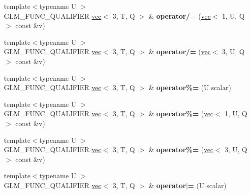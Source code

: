 \begin{DoxyCompactItemize}
{\footnotesize template$<$typename U $>$ }\\G\+L\+M\+\_\+\+F\+U\+N\+C\+\_\+\+Q\+U\+A\+L\+I\+F\+I\+ER \hyperlink{structglm_1_1vec}{vec}$<$ 3, T, Q $>$ \& {\bfseries operator/=} (\hyperlink{structglm_1_1vec}{vec}$<$ 1, U, Q $>$ const \&v)
\item 
\mbox{\label{structglm_1_1vec_3_013_00_01T_00_01Q_01_4_ace726247678030918d73ae2206dcacbe}} 
{\footnotesize template$<$typename U $>$ }\\G\+L\+M\+\_\+\+F\+U\+N\+C\+\_\+\+Q\+U\+A\+L\+I\+F\+I\+ER \hyperlink{structglm_1_1vec}{vec}$<$ 3, T, Q $>$ \& {\bfseries operator/=} (\hyperlink{structglm_1_1vec}{vec}$<$ 3, U, Q $>$ const \&v)
\item 
\mbox{\label{structglm_1_1vec_3_013_00_01T_00_01Q_01_4_a4b64d60016fdc6a48a5003aa67e9de29}} 
{\footnotesize template$<$typename U $>$ }\\G\+L\+M\+\_\+\+F\+U\+N\+C\+\_\+\+Q\+U\+A\+L\+I\+F\+I\+ER \hyperlink{structglm_1_1vec}{vec}$<$ 3, T, Q $>$ \& {\bfseries operator\%=} (U scalar)
\item 
\mbox{\label{structglm_1_1vec_3_013_00_01T_00_01Q_01_4_af436942fa5f5b2329bede870f539a223}} 
{\footnotesize template$<$typename U $>$ }\\G\+L\+M\+\_\+\+F\+U\+N\+C\+\_\+\+Q\+U\+A\+L\+I\+F\+I\+ER \hyperlink{structglm_1_1vec}{vec}$<$ 3, T, Q $>$ \& {\bfseries operator\%=} (\hyperlink{structglm_1_1vec}{vec}$<$ 1, U, Q $>$ const \&v)
\item 
\mbox{\label{structglm_1_1vec_3_013_00_01T_00_01Q_01_4_ae6a625383036d5b89748613801ad94e6}} 
{\footnotesize template$<$typename U $>$ }\\G\+L\+M\+\_\+\+F\+U\+N\+C\+\_\+\+Q\+U\+A\+L\+I\+F\+I\+ER \hyperlink{structglm_1_1vec}{vec}$<$ 3, T, Q $>$ \& {\bfseries operator\%=} (\hyperlink{structglm_1_1vec}{vec}$<$ 3, U, Q $>$ const \&v)
\item 
\mbox{\label{structglm_1_1vec_3_013_00_01T_00_01Q_01_4_a5c8e5e0dd0ca430f5e2a7d346d31f809}} 
{\footnotesize template$<$typename U $>$ }\\G\+L\+M\+\_\+\+F\+U\+N\+C\+\_\+\+Q\+U\+A\+L\+I\+F\+I\+ER \hyperlink{structglm_1_1vec}{vec}$<$ 3, T, Q $>$ \& {\bfseries operator$\vert$=} (U scalar)

\end{DoxyCompactItemize}

